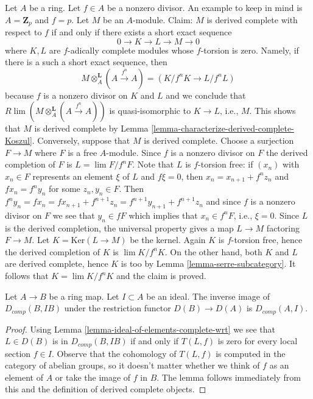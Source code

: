 \begin{example}
\label{example-derived-complete-modules}
Let $A$ be a ring. Let $f \in A$ be a nonzero divisor. An example
to keep in mind is $A = \mathbf{Z}_p$ and $f = p$. Let $M$ be
an $A$-module. Claim: $M$ is derived complete with respect to $f$
if and only if there exists a short exact sequence
$$
0 \to K \to L \to M \to 0
$$
where $K, L$ are $f$-adically complete modules whose $f$-torsion is zero.
Namely, if there is a such a short exact sequence, then
$$
M \otimes_A^\mathbf{L} (A \xrightarrow{f^n} A) = (K/f^nK \to L/f^nL)
$$
because $f$ is a nonzero divisor on $K$ and $L$
and we conclude that $R\lim (M \otimes_A^\mathbf{L} (A \xrightarrow{f^n} A))$
is quasi-isomorphic to $K \to L$, i.e., $M$. This shows that $M$ is
derived complete by Lemma \ref{lemma-characterize-derived-complete-Koszul}.
Conversely, suppose that $M$ is derived complete. Choose a surjection
$F \to M$ where $F$ is a free $A$-module. Since $f$ is a nonzero divisor
on $F$ the derived completion of $F$ is $L = \lim F/f^nF$.
Note that $L$ is $f$-torsion free: if $(x_n)$ with $x_n \in F$ represents
an element $\xi$ of $L$ and $f\xi = 0$, then $x_n = x_{n + 1} + f^nz_n$
and $fx_n = f^ny_n$ for some $z_n, y_n \in F$. Then $f^n y_n = fx_n =
fx_{n + 1} + f^{n + 1}z_n = f^{n + 1}y_{n + 1} + f^{n + 1}z_n$ and since
$f$ is a nonzero divisor on $F$ we see that $y_n \in fF$ which implies
that $x_n \in f^nF$, i.e., $\xi = 0$. Since $L$ is the derived
completion, the universal property gives a map $L \to M$ factoring
$F \to M$. Let $K = \text{Ker}(L \to M)$ be the kernel.
Again $K$ is $f$-torsion free, hence the derived completion of
$K$ is $\lim K/f^nK$. On the other hand, both $K$ and $L$ are derived
complete, hence $K$ is too by Lemma \ref{lemma-serre-subcategory}.
It follows that $K = \lim K/f^nK$ and the claim is proved.
\end{example}

\begin{lemma}
\label{lemma-restriction-derived-complete}
Let $A \to B$ be a ring map. Let $I \subset A$ be an ideal. The inverse
image of $D_{comp}(B, IB)$ under the restriction functor $D(B) \to D(A)$ is
$D_{comp}(A, I)$.
\end{lemma}

\begin{proof}
Using Lemma \ref{lemma-ideal-of-elements-complete-wrt}
we see that $L \in D(B)$ is in $D_{comp}(B, IB)$
if and only if $T(L, f)$ is zero for every local section
$f \in I$. Observe that the cohomology of
$T(L, f)$ is computed in the category of abelian groups,
so it doesn't matter whether we think of $f$ as an element of $A$
or take the image of $f$ in $B$.
The lemma follows immediately from this and the
definition of derived complete objects.
\end{proof}

